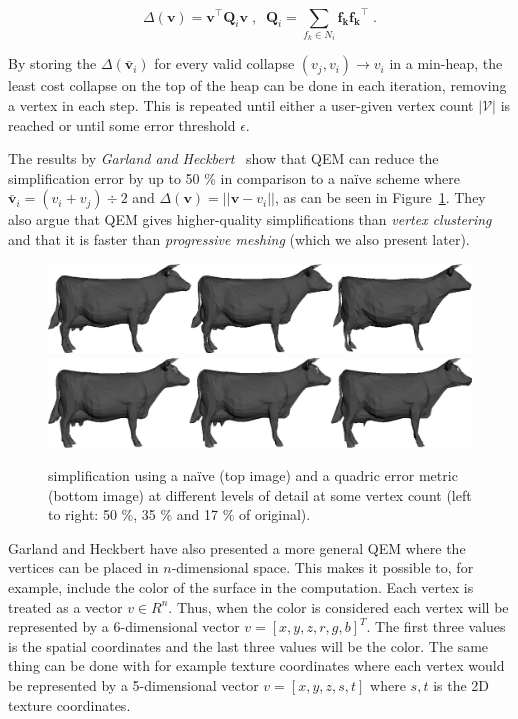 \begin{equation}\Delta(\mathbf{v}) = \mathbf{v}^\intercal \mathbf{Q}_i  \mathbf{v} \;,\;\; \mathbf{Q}_i = \sum_{f_k \in N_i}  \mathbf{f_k} \mathbf{f_k}^\intercal \; .\end{equation}

By storing the \(\Delta(\mathbf{\bar{v}}_i)\) for every valid collapse \((v_j, v_i) \rightarrow v_i\) in a min-heap, the least cost collapse on the top of the heap can be done in each iteration, removing a vertex in each step. This is repeated until either a user-given vertex count \(|\mathcal{V}|\) is reached or until some error threshold \(\epsilon\).

The results by \emph{Garland and Heckbert}~\cite{garland1997surface} show that QEM can reduce the simplification error by up to 50 \% in comparison to a na\"ive scheme where \(\mathbf{\bar{v}}_i = (v_i + v_j) \div 2\) and \(\Delta(\mathbf{v}) = ||\mathbf{v} - v_i||\), as can be seen in Figure~\ref{fig:naive_vs_quadric}. They also argue that QEM gives higher-quality simplifications than \emph{vertex clustering} and that it is faster than \emph{progressive meshing} (which we also present later).

\begin{figure}[h]
    \centering
    \includegraphics[width=\textwidth]{figures/naive_simplification.png}
    \includegraphics[width=\textwidth]{figures/quadric_simplification.png}
    \caption{simplification using a na\"ive (top image) and a quadric error metric (bottom image) at different levels of detail at some vertex count (left to right: 50 \%, 35 \% and 17 \% of original).}
    \label{fig:naive_vs_quadric}
\end{figure}

Garland and Heckbert \cite{garland1998simplifying} have also presented a more general QEM where the vertices can be placed in $n$-dimensional space. This makes it possible to, for example, include the color of the surface in the computation. Each vertex is treated as a vector $v \in R^n$. Thus, when the color is considered each vertex will be represented by a 6-dimensional vector $v = [x, y, z, r, g, b]^T$. The first three values is the spatial coordinates and the last three values will be the color. The same thing can be done with for example texture coordinates where each vertex would be represented by a 5-dimensional vector $v = [x, y, z, s, t]$ where $s, t$ is the 2D texture coordinates.

